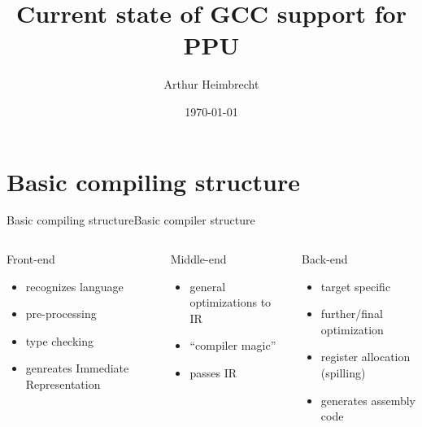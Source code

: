 \documentclass[10pt]{beamer}
\title{Current state of GCC support for PPU}
\author{Arthur Heimbrecht}
\date{\today}
\begin{document}
\begin{frame}
\titlepage
\end{frame}

\begin{frame}
\tableofcontents
\end{frame}

\section{Basic compiling structure}
\begin{frame}{Basic compiling structure}{Basic compiler structure}
	\begin{columns}
		\begin{column}{0.25\textwidth}
      		\begin{block}{Front-end}
       			\begin{itemize}
       				\item recognizes language
       				\item pre-processing
       				\item type checking
       				\item genreates Immediate Representation
       			\end{itemize}
      		\end{block}
    	\end{column}
    	\begin{column}{0.25\textwidth}
      		\begin{block}{Middle-end}
       			\begin{itemize}
       				\item general optimizations to IR
       				\item ``compiler magic''
       				\item passes IR
       			\end{itemize}
      		\end{block}
    	\end{column}
    	\begin{column}{0.25\textwidth}
      		\begin{block}{Back-end}
       			\begin{itemize}
       				\item target specific
       				\item further/final optimization
       				\item register allocation (spilling)
       				\item generates assembly code
       			\end{itemize}
      		\end{block}
    	\end{column}
    \end{columns}
\end{frame}
\end{document}
